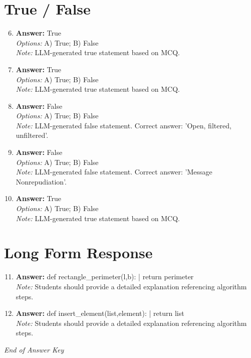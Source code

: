 \documentclass[12pt]{article}
\begin{document}
\section*{True / False}
\begin{enumerate}[label=\arabic*.]
\setcounter{enumi}{5}
\item \textbf{Answer:} True
\\ \textit{Options:} A) True; B) False
\\ \textit{Note:} LLM-generated true statement based on MCQ.
\item \textbf{Answer:} True
\\ \textit{Options:} A) True; B) False
\\ \textit{Note:} LLM-generated true statement based on MCQ.
\item \textbf{Answer:} False
\\ \textit{Options:} A) True; B) False
\\ \textit{Note:} LLM-generated false statement. Correct answer: 'Open, filtered, unfiltered'.
\item \textbf{Answer:} False
\\ \textit{Options:} A) True; B) False
\\ \textit{Note:} LLM-generated false statement. Correct answer: 'Message Nonrepudiation'.
\item \textbf{Answer:} True
\\ \textit{Options:} A) True; B) False
\\ \textit{Note:} LLM-generated true statement based on MCQ.
\end{enumerate}

\section*{Long Form Response}
\begin{enumerate}[label=\arabic*.]
\setcounter{enumi}{10}
\item \textbf{Answer:} def rectangle\_perimeter(l,b): | return perimeter
\\ \textit{Note:} Students should provide a detailed explanation referencing algorithm steps.
\item \textbf{Answer:} def insert\_element(list,element): | return list
\\ \textit{Note:} Students should provide a detailed explanation referencing algorithm steps.
\end{enumerate}

\vfill
\noindent\textit{End of Answer Key}
\end{document}
